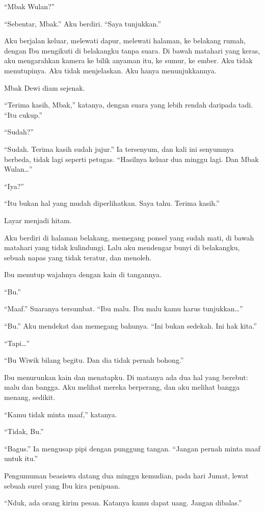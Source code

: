 \documentclass[11pt,twoside,openany]{book}
\makeatletter
\newcommand{\scenebreak}{\par\vspace{0.9em}{\centering\textsc{*\hspace{0.7em}*\hspace{0.7em}*}\par}\vspace{0.9em}\@afterindentfalse\@afterheading}
\makeatother
\begin{document}
``Mbak Wulan?''

``Sebentar, Mbak.'' Aku berdiri. ``Saya tunjukkan.''

Aku berjalan keluar, melewati dapur, melewati halaman, ke belakang rumah, dengan Ibu mengikuti di belakangku tanpa suara. Di bawah matahari yang keras, aku mengarahkan kamera ke bilik anyaman itu, ke sumur, ke ember. Aku tidak menutupinya. Aku tidak menjelaskan. Aku hanya menunjukkannya.

Mbak Dewi diam sejenak.

``Terima kasih, Mbak,'' katanya, dengan suara yang lebih rendah daripada tadi. ``Itu cukup.''

``Sudah?''

``Sudah. Terima kasih sudah jujur.'' Ia tersenyum, dan kali ini senyumnya berbeda, tidak lagi seperti petugas. ``Hasilnya keluar dua minggu lagi. Dan Mbak Wulan\ldots{}''

``Iya?''

``Itu bukan hal yang mudah diperlihatkan. Saya tahu. Terima kasih.''

Layar menjadi hitam.

Aku berdiri di halaman belakang, memegang ponsel yang sudah mati, di bawah matahari yang tidak kulindungi. Lalu aku mendengar bunyi di belakangku, sebuah napas yang tidak teratur, dan menoleh.

Ibu menutup wajahnya dengan kain di tangannya.

``Bu.''

``Maaf.'' Suaranya tersumbat. ``Ibu malu. Ibu malu kamu harus tunjukkan\ldots{}''

``Bu.'' Aku mendekat dan memegang bahunya. ``Ini bukan sedekah. Ini hak kita.''

``Tapi\ldots{}''

``Bu Wiwik bilang begitu. Dan dia tidak pernah bohong.''

Ibu menurunkan kain dan menatapku. Di matanya ada dua hal yang berebut: malu dan bangga. Aku melihat mereka berperang, dan aku melihat bangga menang, sedikit.

``Kamu tidak minta maaf,'' katanya.

``Tidak, Bu.''

``Bagus.'' Ia mengusap pipi dengan punggung tangan. ``Jangan pernah minta maaf untuk itu.''

\scenebreak
Pengumuman beasiswa datang dua minggu kemudian, pada hari Jumat, lewat sebuah surel yang Ibu kira penipuan.

``Nduk, ada orang kirim pesan. Katanya kamu dapat uang. Jangan dibalas.''
\end{document}
